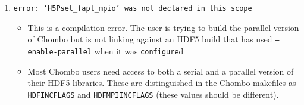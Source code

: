 
\def\bi{\begin{itemize}}
\def\ei{\end{itemize}}
\def\I{\item}
\begin{enumerate}

\I {\tt error: 'H5Pset\_fapl\_mpio' was not declared in this scope}
\bi
 \I This is a compilation error.  The user is trying to build the parallel version of Chombo
    but is not linking against an HDF5 build that has used {\tt --enable-parallel} when it 
    was {\tt configure}d
 \I Most Chombo users need access to both a serial and a parallel version of their HDF5 libraries.
    These are distinguished in the Chombo makefiles as {\tt HDFINCFLAGS} and {\tt HDFMPIINCFLAGS}
    (these values should be different).
\ei
 


\end{enumerate}


